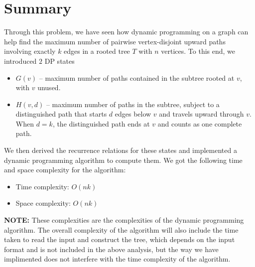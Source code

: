 \documentclass[11pt]{scrartcl}
\theoremstyle{plain}
\theoremstyle{definition}
\theoremstyle{remark}
\newcounter{problem}
\begin{document}
\section{Summary}
Through this problem, we have seen how dynamic programming on a graph can help find the maximum number of pairwise vertex-disjoint upward
paths involving exactly $k$ edges in a rooted tree $T$ with $n$ vertices. To this end, we introduced $2$ DP states
\begin{itemize}
  \item $G(v)$ -- maximum number of paths contained in the subtree rooted at \(v\), with \(v\) unused.
  \item $H(v,d)$ -- maximum number of paths in the subtree, subject to a distinguished path that starts \(d\) edges below \(v\) and travels upward through \(v\). When \(d=k\), the distinguished path ends at \(v\) and counts as one complete path.
\end{itemize}We then derived the recurrence relations for these states and implemented a dynamic programming algorithm to compute them. We got the following time and space complexity for the algorithm:
\begin{itemize}
    \item Time complexity: $O(nk)$
    \item Space complexity: $O(nk)$
\end{itemize}
\textbf{NOTE:} These complexities are the complexities of the dynamic programming algorithm. The overall complexity of the algorithm will also include the time taken to read the input and construct the tree, which depends on the input format and is not included in the above analysis, but the way we have implimented does not interfere with the time complexity of the algorithm.
\begin{center}
  \decofourleft\decofourleft\decofourleft
\end{center}
\end{document}
